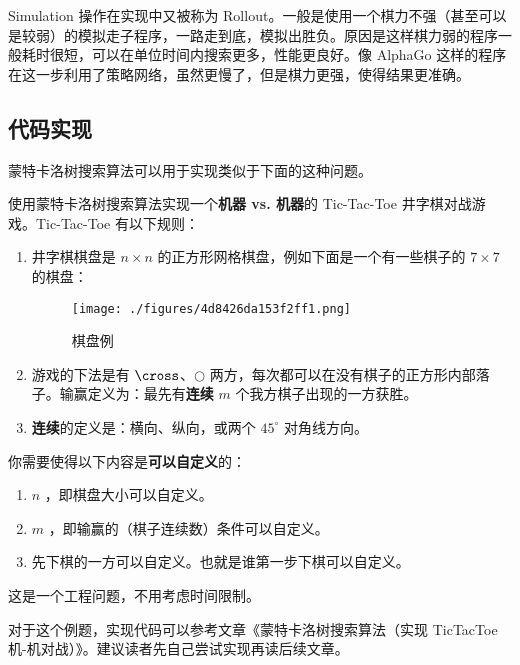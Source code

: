 Simulation 操作在实现中又被称为 Rollout。一般是使用一个棋力不强（甚至可以是较弱）的模拟走子程序，一路走到底，模拟出胜负。原因是这样棋力弱的程序一般耗时很短，可以在单位时间内搜索更多，性能更良好。像 AlphaGo 这样的程序在这一步利用了策略网络，虽然更慢了，但是棋力更强，使得结果更准确。

\subsection{代码实现}
蒙特卡洛树搜索算法可以用于实现类似于下面的这种问题。
\begin{example}{}
使用蒙特卡洛树搜索算法实现一个\textbf{机器 vs. 机器}的 Tic-Tac-Toe 井字棋对战游戏。Tic-Tac-Toe 有以下规则：
\begin{enumerate}
\item 井字棋棋盘是 $n \times n$ 的正方形网格棋盘，例如下面是一个有一些棋子的 $7 \times 7$ 的棋盘：
\begin{figure}[ht]
\centering
\texttt{[image: ./figures/4d8426da153f2ff1.png]}
\caption{棋盘例} \label{fig_MCTS_2}
\end{figure}
\item 游戏的下法是有 $\cross$、$\bigcirc$ 两方，每次都可以在没有棋子的正方形内部落子。输赢定义为：最先有\textbf{连续} $m$ 个我方棋子出现的一方获胜。
\item \textbf{连续}的定义是：横向、纵向，或两个 $45^\circ$ 对角线方向。
\end{enumerate}

你需要使得以下内容是\textbf{可以自定义}的：
\begin{enumerate}
\item $n$ ，即棋盘大小可以自定义。
\item $m$ ，即输赢的（棋子连续数）条件可以自定义。
\item 先下棋的一方可以自定义。也就是谁第一步下棋可以自定义。
\end{enumerate}

这是一个工程问题，不用考虑时间限制。
\end{example}
对于这个例题，实现代码可以参考文章《蒙特卡洛树搜索算法（实现 TicTacToe 机-机对战）》。建议读者先自己尝试实现再读后续文章。